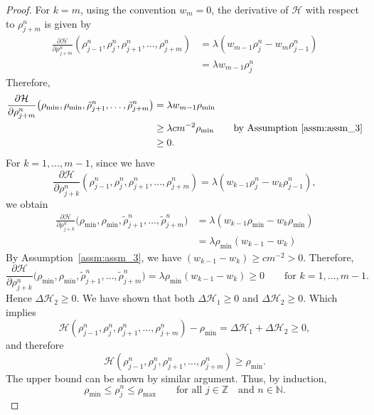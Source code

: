\begin{proof}
    For $k=m$, using the convention $w_m=0$, the derivative of $\mathcal{H}$ with respect to $\rho_{j+m}^n$ is given by
    \begin{align*}
        \frac{\partial \mathcal{H}}{\partial \rho_{j+m}^n}(\rho_{j-1}^n, \rho_{j}^n, \rho_{j+1}^n, \dots, \rho_{j+m}^n) & =\lambda\left(w_{m-1}\rho_j^n-w_m\rho_{j-1}^n\right) \\
                                                                                                                        & = \lambda w_{m-1}\rho_j^n
    \end{align*}
    Therefore,
    \begin{align*}
        \frac{\partial \mathcal{H}}{\partial \rho_{j+m}^n}
        \bigl(
        \rho_{\min},\rho_{\min},
        \tilde\rho_{j+1}^n,\dots,\tilde\rho_{j+m}^n
        \bigr)
         & = \lambda w_{m-1}\rho_{\min}                                                  \\
         & \geq \lambda cm^{-2}\rho_{\min} \qquad \text{by Assumption~\ref{assm:assm_3}} \\
         & \geq 0.
    \end{align*}
    For $k=1,\dots,m-1$, since we have
    \[ \frac{\partial \mathcal{H}}{\partial \rho_{j+k}^n}(\rho_{j-1}^n, \rho_{j}^n, \rho_{j+1}^n, \dots, \rho_{j+m}^n)
        =
        \lambda\left(w_{k-1}\rho_j^n-w_k\rho_{j-1}^n\right),\]
    we obtain
    \begin{align*}
        \frac{\partial \mathcal{H}}{\partial \rho_{j+k}^n}
        \bigl(
        \rho_{\min},\rho_{\min},
        \tilde{\rho}_{j+1}^n,\dots,\tilde\rho_{j+m}^n
        \bigr) & = \lambda \left(w_{k-1}\rho_{\min} - w_{k}\rho_{\min}\right) \\
               & = \lambda \rho_{\min} (w_{k-1}- w_{k})
    \end{align*}
    By Assumption~\ref{assm:assm_3}, we have $(w_{k-1}- w_{k}) \geq cm^{-2} > 0$. Therefore,
    \[
        \frac{\partial \mathcal{H}}{\partial \rho_{j+k}^n}
        \bigl(
        \rho_{\min},\rho_{\min},
        \tilde\rho_{j+1}^n,\dots,\tilde\rho_{j+m}^n
        \bigr)= \lambda \rho_{\min} \left(w_{k-1}- w_{k}\right) \geq 0 \qquad \text{for } k=1,\dots,m-1.
    \]
    Hence $\Delta \mathcal{H}_2 \geq 0$. We have shown that both $ \Delta \mathcal{H}_1 \geq 0 $ and $ \Delta \mathcal{H}_2 \geq 0$. Which implies
    \[
        \mathcal{H}(\rho_{j-1}^n,\rho_j^n,\rho_{j+1}^n,\dots,\rho_{j+m}^n)-\rho_{\min}
        =
        \Delta \mathcal{H}_1+\Delta \mathcal{H}_2 \geq 0 ,\]
    and therefore
    \[
        \mathcal{H}(\rho_{j-1}^n,\rho_j^n,\rho_{j+1}^n,\dots,\rho_{j+m}^n) \geq \rho_{\min}.
    \]
    The upper bound can be shown by similar argument. Thus, by induction,
    \[
        \rho_{\min} \leq \rho_j^n \leq \rho_{\max} \qquad \text{for all }  j \in \mathbb{Z} \quad \text{and } n \in \mathbb{N}.
    \]
\end{proof}

